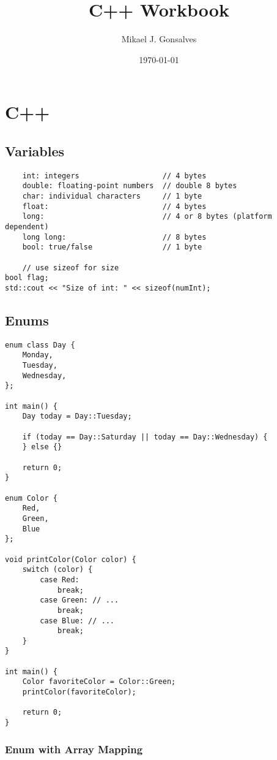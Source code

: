 \documentclass[openany]{report}
\title{C++ Workbook}
\author{Mikael J. Gonsalves}
\date{\today}
\begin{document}
\maketitle
\tableofcontents



\chapter{C++}

\section{Variables}

\begin{verbatim}
    int: integers                   // 4 bytes
    double: floating-point numbers  // double 8 bytes
    char: individual characters     // 1 byte
    float:                          // 4 bytes
    long:                           // 4 or 8 bytes (platform dependent)
    long long:                      // 8 bytes
    bool: true/false                // 1 byte

    // use sizeof for size
bool flag;
std::cout << "Size of int: " << sizeof(numInt); 

\end{verbatim}

\section{Enums}

\begin{verbatim}
enum class Day {
    Monday,
    Tuesday,
    Wednesday,
};

int main() {
    Day today = Day::Tuesday;

    if (today == Day::Saturday || today == Day::Wednesday) {
    } else {}

    return 0;
}

enum Color {
    Red,
    Green,
    Blue
};

void printColor(Color color) {
    switch (color) {
        case Red:
            break;
        case Green: // ...
            break;
        case Blue: // ...
            break;
    }
}

int main() {
    Color favoriteColor = Color::Green;
    printColor(favoriteColor);

    return 0;
}
\end{verbatim}

\subsection{Enum with Array Mapping}
\end{document}
